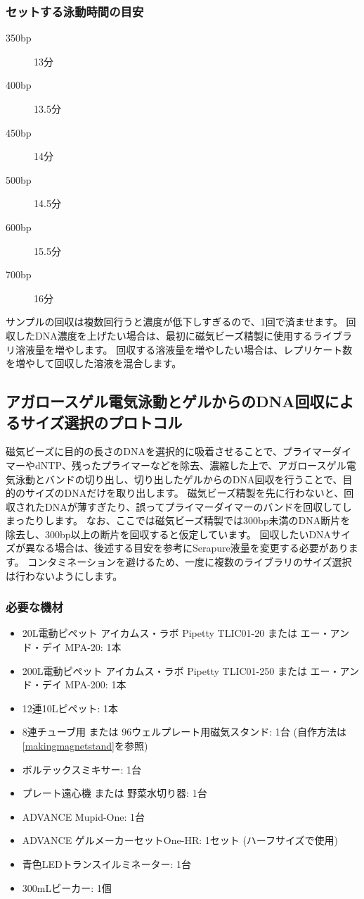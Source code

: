 \documentclass[titlepage,10pt,a4paper,uplatex]{jsbook}
\begin{document}
\subsubsection{セットする泳動時間の目安}
\begin{description}
\item[350bp] 13分
\item[400bp] 13.5分
\item[450bp] 14分
\item[500bp] 14.5分
\item[600bp] 15.5分
\item[700bp] 16分
\end{description}

サンプルの回収は複数回行うと濃度が低下しすぎるので、1回で済ませます。
回収したDNA濃度を上げたい場合は、最初に磁気ビーズ精製に使用するライブラリ溶液量を増やします。
回収する溶液量を増やしたい場合は、レプリケート数を増やして回収した溶液を混合します。

\subsection{アガロースゲル電気泳動とゲルからのDNA回収によるサイズ選択のプロトコル}

磁気ビーズに目的の長さのDNAを選択的に吸着させることで、プライマーダイマーやdNTP、残ったプライマーなどを除去、濃縮した上で、アガロースゲル電気泳動とバンドの切り出し、切り出したゲルからのDNA回収を行うことで、目的のサイズのDNAだけを取り出します。
磁気ビーズ精製を先に行わないと、回収されたDNAが薄すぎたり、誤ってプライマーダイマーのバンドを回収してしまったりします。
なお、ここでは磁気ビーズ精製では300bp未満のDNA断片を除去し、300bp以上の断片を回収すると仮定しています。
回収したいDNAサイズが異なる場合は、後述する目安を参考にSerapure液量を変更する必要があります。
コンタミネーションを避けるため、一度に複数のライブラリのサイズ選択は行わないようにします。

\subsubsection{必要な機材}
\begin{itemize}
\item 20{\textmu}L電動ピペット アイカムス・ラボ Pipetty TLIC01-20 または エー・アンド・デイ MPA-20: 1本
\item 200{\textmu}L電動ピペット アイカムス・ラボ Pipetty TLIC01-250 または エー・アンド・デイ MPA-200: 1本
\item 12連10{\textmu}Lピペット: 1本
\item 8連チューブ用 または 96ウェルプレート用磁気スタンド: 1台 (自作方法は\ref{makingmagnetstand}を参照)
\item ボルテックスミキサー: 1台
\item プレート遠心機 または 野菜水切り器: 1台
\item ADVANCE Mupid-One: 1台
\item ADVANCE ゲルメーカーセットOne-HR: 1セット (ハーフサイズで使用)
\item 青色LEDトランスイルミネーター: 1台
\item 300mLビーカー: 1個
\end{itemize}
\end{document}
